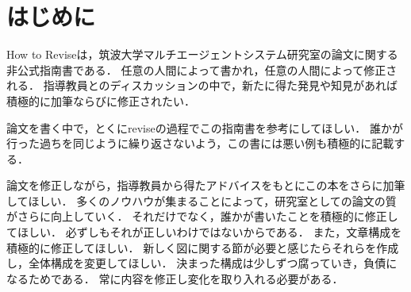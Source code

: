 \section{はじめに}

How to Reviseは，筑波大学マルチエージェントシステム研究室の論文に関する非公式指南書である．
任意の人間によって書かれ，任意の人間によって修正される．
指導教員とのディスカッションの中で，新たに得た発見や知見があれば積極的に加筆ならびに修正されたい．

論文を書く中で，とくにreviseの過程でこの指南書を参考にしてほしい．
誰かが行った過ちを同じように繰り返さないよう，この書には悪い例も積極的に記載する．

論文を修正しながら，指導教員から得たアドバイスをもとにこの本をさらに加筆してほしい．
多くのノウハウが集まることによって，研究室としての論文の質がさらに向上していく．
それだけでなく，誰かが書いたことを積極的に修正してほしい．
必ずしもそれが正しいわけではないからである．
また，文章構成を積極的に修正してほしい．
新しく図に関する節が必要と感じたらそれらを作成し，全体構成を変更してほしい．
決まった構成は少しずつ腐っていき，負債になるためである．
常に内容を修正し変化を取り入れる必要がある．



